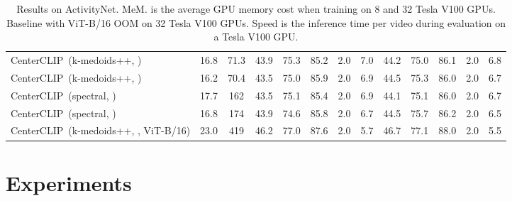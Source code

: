 \documentclass[sigconf]{acmart}
\begin{document}
\begin{table*}[t]
{\begin{tabular}{lcc|ccccc|ccccc}
			CenterCLIP~(k-medoids++, )
			 & 16.8 & 71.3
			& 43.9 &  75.3 & 85.2 & 2.0 & 7.0
			& 44.2 & 75.0 & 86.1 & 2.0 & 6.8  \\
			
			CenterCLIP~(k-medoids++, )
			& \cellcolor{Gray}16.2 & \cellcolor{Gray}70.4 
			& 43.5 & 75.0 & 85.9 & 2.0 & 6.9 
			& 44.5 & 75.3 & 86.0 & 2.0 & 6.7 	  \\
			
			CenterCLIP~(spectral, )
			& 17.7 & 162 
			& 43.5 & 75.1 & 85.4 & 2.0 & 6.9 
			& 44.1 & 75.1 & 86.0 & 2.0 & 6.7  \\
			
			CenterCLIP~(spectral, )
			& 16.8 & 174 
			& 43.9 & 74.6 & 85.8 & 2.0 &  6.7
			& 44.5 & 75.7 & 86.2 & 2.0 & 6.5  \\
			\midrule


			CenterCLIP~(k-medoids++, , ViT-B/16)
			& 23.0 & 419 
			& \cellcolor{Gray}46.2 & \cellcolor{Gray}77.0
			& \cellcolor{Gray}87.6 & \cellcolor{Gray}2.0
			& \cellcolor{Gray}5.7 
			& \cellcolor{Gray}46.7 & \cellcolor{Gray}77.1 
			& \cellcolor{Gray}88.0 & \cellcolor{Gray}2.0 
			& \cellcolor{Gray}5.5  \\	

			\bottomrule
		\end{tabular}
	}
	\caption{ Results on ActivityNet. 
		MeM. is the average GPU memory cost when training on 8 and 
		32 Tesla V100 GPUs. Baseline with ViT-B/16 OOM on 32 Tesla V100 GPUs.
		Speed is the inference time per video during evaluation on a Tesla V100 GPU. 
	}
	\label{tab:result_ACT}
\end{table*}

\section{Experiments}
\end{document}

